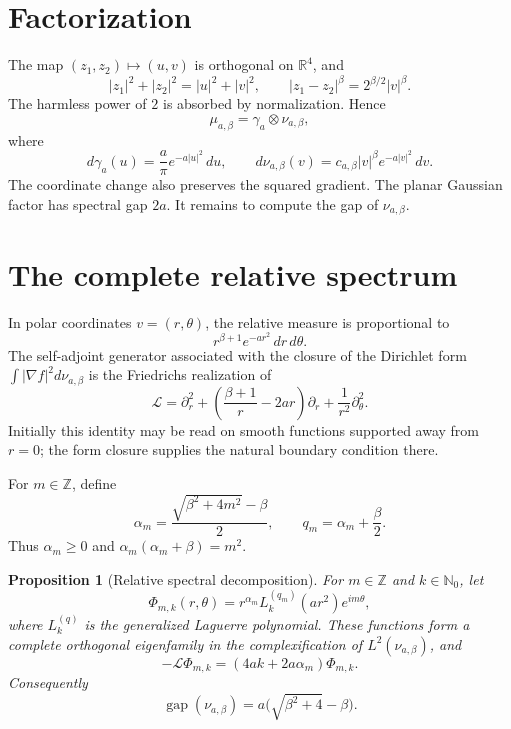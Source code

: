 \documentclass[11pt]{article}
\newtheorem{proposition}[theorem]{Proposition}
\newcommand{\R}{\mathbb R}
\newcommand{\cL}{\mathcal L}
\begin{document}
\section{Factorization}

The map $(z_1,z_2)\mapsto(u,v)$ is orthogonal on $\R^4$, and
\[
 |z_1|^2+|z_2|^2=|u|^2+|v|^2,\qquad
 |z_1-z_2|^\beta=2^{\beta/2}|v|^\beta.
\]
The harmless power of $2$ is absorbed by normalization.  Hence
\begin{equation}\label{eq:product}
 \mu_{a,\beta}=\gamma_a\otimes\nu_{a,\beta},
\end{equation}
where
\[
 d\gamma_a(u)=\frac a\pi e^{-a|u|^2}\,du,
 \qquad
 d\nu_{a,\beta}(v)=c_{a,\beta}|v|^\beta e^{-a|v|^2}\,dv.
\]
The coordinate change also preserves the squared gradient.  The planar
Gaussian factor has spectral gap $2a$.  It remains to compute the gap of
$\nu_{a,\beta}$.

\section{The complete relative spectrum}

In polar coordinates $v=(r,\theta)$, the relative measure is proportional to
\[
 r^{\beta+1}e^{-ar^2}\,dr\,d\theta.
\]
The self-adjoint generator associated with the closure of the Dirichlet form
$\int|\nabla f|^2d\nu_{a,\beta}$ is the Friedrichs realization of
\begin{equation}\label{eq:generator}
 \cL=\partial_r^2+\left(\frac{\beta+1}{r}-2ar\right)\partial_r
       +\frac1{r^2}\partial_\theta^2.
\end{equation}
Initially this identity may be read on smooth functions supported away from
$r=0$; the form closure supplies the natural boundary condition there.

For $m\in\mathbb Z$, define
\begin{equation}\label{eq:alpha}
 \alpha_m=\frac{\sqrt{\beta^2+4m^2}-\beta}{2},\qquad
 q_m=\alpha_m+\frac\beta2.
\end{equation}
Thus $\alpha_m\geq0$ and $\alpha_m(\alpha_m+\beta)=m^2$.

\begin{proposition}[Relative spectral decomposition]\label{prop:spectrum}
For $m\in\mathbb Z$ and $k\in\mathbb N_0$, let
\begin{equation}\label{eq:eigenfunction}
 \Phi_{m,k}(r,\theta)
 =r^{\alpha_m}L_k^{(q_m)}(ar^2)e^{im\theta},
\end{equation}
where $L_k^{(q)}$ is the generalized Laguerre polynomial.  These functions
form a complete orthogonal eigenfamily in the complexification of
$L^2(\nu_{a,\beta})$, and
\begin{equation}\label{eq:eigenvalues}
 -\cL\Phi_{m,k}=(4ak+2a\alpha_m)\Phi_{m,k}.
\end{equation}
Consequently
\[
 \operatorname{gap}(\nu_{a,\beta})
 =a\bigl(\sqrt{\beta^2+4}-\beta\bigr).
\]
\end{proposition}
\end{document}
